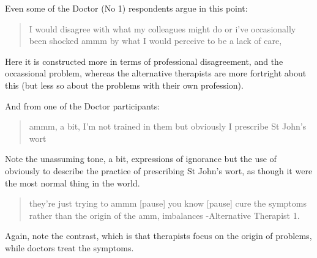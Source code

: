 Even some of the Doctor (No 1) respondents argue in this point:

\begin{quotation}
  I would disagree with what my colleagues might do or i've occasionally been shocked ammm by what I would perceive to be a lack of care,

\end{quotation}

Here it is constructed more in terms of professional disagreement, and the occassional problem, whereas the alternative therapists are more fortright about this (but less so about the problems with their own profession). 

And from one of the Doctor participants: 

\begin{quotation}
  ammm, a bit, I'm not trained in them but obviously I prescribe St John's wort

\end{quotation}

Note the unassuming tone, a bit, expressions of ignorance but the use of obviously to describe the practice of prescribing St John's wort, as though it were the most normal thing in the world. 





\begin{quotation}
  they're just trying to ammm [pause] you know [pause] cure the symptoms rather than the origin of the amm, imbalances
-Alternative Therapist 1. 
\end{quotation}

Again, note the contrast, which is that therapists focus on the origin of problems, while doctors treat the symptoms. 

